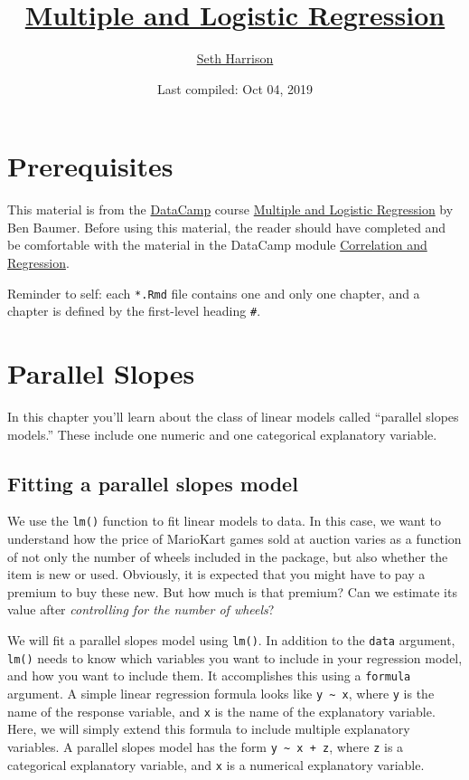 \documentclass[]{book}
\title{\href{https://www.datacamp.com/courses/multiple-and-logistic-regression}{Multiple
and Logistic Regression}}
\author{\href{https://your_username.github.io/}{Seth Harrison}}
\date{Last compiled: Oct 04, 2019}
\begin{document}
\maketitle

{
\setcounter{tocdepth}{1}
\tableofcontents
}
\chapter{Prerequisites}\label{prerequisites}

This material is from the \href{https://www.datacamp.com}{DataCamp}
course
\href{https://www.datacamp.com/courses/multiple-and-logistic-regression}{Multiple
and Logistic Regression} by Ben Baumer. Before using this material, the
reader should have completed and be comfortable with the material in the
DataCamp module
\href{https://www.datacamp.com/courses/correlation-and-regression}{Correlation
and Regression}.

Reminder to self: each \texttt{*.Rmd} file contains one and only one
chapter, and a chapter is defined by the first-level heading
\texttt{\#}.

\chapter{Parallel Slopes}\label{parallel-slopes}

In this chapter you'll learn about the class of linear models called
``parallel slopes models.'' These include one numeric and one
categorical explanatory variable.

\section{Fitting a parallel slopes
model}\label{fitting-a-parallel-slopes-model}

We use the \texttt{lm()} function to fit linear models to data. In this
case, we want to understand how the price of MarioKart games sold at
auction varies as a function of not only the number of wheels included
in the package, but also whether the item is new or used. Obviously, it
is expected that you might have to pay a premium to buy these new. But
how much is that premium? Can we estimate its value after
\emph{controlling for the number of wheels}?

We will fit a parallel slopes model using \texttt{lm()}. In addition to
the \texttt{data} argument, \texttt{lm()} needs to know which variables
you want to include in your regression model, and how you want to
include them. It accomplishes this using a \texttt{formula} argument. A
simple linear regression formula looks like
\texttt{y\ \textasciitilde{}\ x}, where \texttt{y} is the name of the
response variable, and \texttt{x} is the name of the explanatory
variable. Here, we will simply extend this formula to include multiple
explanatory variables. A parallel slopes model has the form
\texttt{y\ \textasciitilde{}\ x\ +\ z}, where \texttt{z} is a
categorical explanatory variable, and \texttt{x} is a numerical
explanatory variable.
\end{document}
